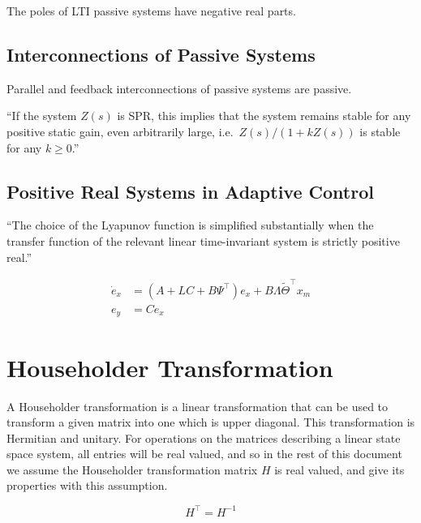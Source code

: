 The poles of LTI passive systems have negative real parts.

\subsection{Interconnections of Passive Systems}

Parallel and feedback interconnections of passive systems are passive.\cite{lozano.dissipative.2000}

``If the system $Z(s)$ is SPR, this implies that the system remains stable for any positive static gain, even arbitrarily large, i.e.\ $Z(s)/(1+kZ(s))$ is stable for any $k\geq0$.''

\subsection{Positive Real Systems in Adaptive Control}

``The choice of the Lyapunov function is simplified substantially when the transfer function of the relevant linear time-invariant system is strictly positive real.''~\cite{rusnak.spr.2009}

\begin{equation*}
  \begin{split}
    \dot{e}_{x} &= (A+LC+B\Psi^{\top})e_{x} + B\Lambda\widetilde{\Theta}^{\top}x_{m} \\
    e_{y} &= Ce_{x}
  \end{split}
\end{equation*}

\section{Householder Transformation}

A Householder transformation is a linear transformation that can be used to transform a given matrix into one which is upper diagonal.
This transformation is Hermitian and unitary.
For operations on the matrices describing a linear state space system, all entries will be real valued, and so in the rest of this document we assume the Householder transformation matrix $H$ is real valued, and give its properties with this assumption.

\begin{equation*}
  H^{\top}=H^{-1}
\end{equation*}

